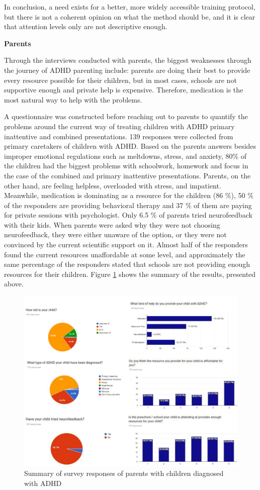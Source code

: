 \documentclass[letterpaper,10pt]{article}
\begin{document}
In conclusion, a need exists for a better, more widely accessible training protocol, but there is not a coherent opinion on what the method should be, and it is clear that attention levels only are not descriptive enough.

\textbf{Parents}

Through the interviews conducted with parents, the biggest weaknesses through the journey of ADHD parenting include: parents are doing their best to provide every resource possible for their children, but in most cases, schools are not supportive enough and private help is expensive. Therefore, medication is the most natural way to help with the problems.

A questionnaire was constructed before reaching out to parents to quantify the problems around the current way of treating children with ADHD primary inattentive and combined presentations. 
139 responses were collected from primary caretakers of children with ADHD. Based on the parents answers besides improper emotional regulations such as meltdowns, stress, and anxiety, 80\% of the children had the biggest problems with schoolwork, homework and focus in the case of the combined and primary inattentive presentations. Parents, on the other hand, are feeling helpless, overloaded with stress, and impatient. Meanwhile, medication is dominating as a resource for the children (86 \%), 50 \% of the responders are providing behavioral therapy and 37 \% of them are paying for private sessions with psychologist. Only 6.5 \% of parents tried neurofeedback with their kids. 
When parents were asked why they were not choosing neurofeedback, they were either unaware of the option, or they were not convinced by the current scientific support on it. Almost half of the responders found the current resources unaffordable at some level, and approximately the same percentage of the responders stated that schools are not providing enough resources for their children. Figure \ref{img:survey} shows the summary of the results, presented above.


\begin{figure}[!htb]
\centering
\includegraphics[scale=0.5]{survey.png}
\caption{Summary of survey responses of parents with children diagnosed with ADHD}
\label{img:survey}
\end{figure}
\end{document}
